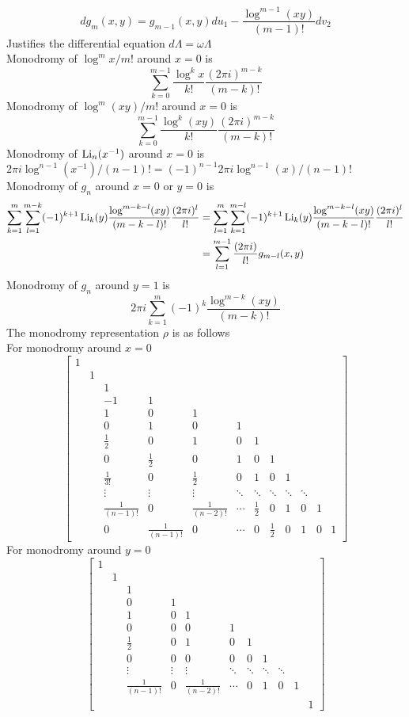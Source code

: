 \documentclass[main]{subfiles}
\begin{document}
\[dg_m(x,y)=g_{m-1}(x,y)du_1-\frac{\log^{m-1}(xy)}{(m-1)!}dv_2\]
Justifies the differential equation $d\Lambda=\omega\Lambda$ \\
Monodromy of $\log^mx/m!$ around $x=0$ is
\[\sum_{k=0}^{m-1}\frac{\log^kx}{k!}\frac{(2\pi i)^{m-k}}{(m-k)!}\]
Monodromy of $\log^m(xy)/m!$ around $x=0$ is
\[\sum_{k=0}^{m-1}\frac{\log^k(xy)}{k!}\frac{(2\pi i)^{m-k}}{(m-k)!}\]
Monodromy of $\operatorname{Li}_n(x^{-1})$ around $x=0$ is $2\pi i\log^{n-1}(x^{-1})/(n-1)!=(-1)^{n-1}2\pi i\log^{n-1}(x)/(n-1)!$ \\
Monodromy of $g_n$ around $x=0$ or $y=0$ is
\begin{align*}
\sum_{k=1}^{m}\sum_{l=1}^{m-k}(-1)^{k+1}\operatorname{Li}_k(y)\frac{\log^{m-k-l}(xy)}{(m-k-l)!}\frac{(2\pi i)^{l}}{l!}&=\sum_{l=1}^{m}\sum_{k=1}^{m-l}(-1)^{k+1}\operatorname{Li}_k(y)\frac{\log^{m-k-l}(xy)}{(m-k-l)!}\frac{(2\pi i)^{l}}{l!} \\
&=\sum_{l=1}^{m-1}\frac{(2\pi i)}{l!}g_{m-l}(x,y)
\end{align*}
Monodromy of $g_n$ around $y=1$ is
\[2\pi i\sum_{k=1}^{m}(-1)^k\frac{\log^{m-k}(xy)}{(m-k)!}\]
The monodromy representation $\rho$ is as follows \\
For monodromy around $x=0$
\[\begin{bmatrix}
1\\
&1\\
&&1\\
&&-1&1\\
&&1&0&1\\
&&0&1&0&1\\
&&\frac{1}{2}&0&1&0&1\\
&&0&\frac{1}{2}&0&1&0&1\\
&&\frac{1}{3!}&0&\frac{1}{2}&0&1&0&1\\
&&\vdots&\vdots&\vdots&\ddots&\ddots&\ddots&\ddots&\ddots\\
&&\frac{1}{(n-1)!}&0&\frac{1}{(n-2)!}&\cdots&\frac{1}{2}&0&1&0&1 \\
&&0&\frac{1}{(n-1)!}&0&\cdots&0&\frac{1}{2}&0&1&0&1
\end{bmatrix}\]
For monodromy around $y=0$
\[\begin{bmatrix}
1\\
&1\\
&&1\\
&&0&1\\
&&1&0&1\\
&&0&0&0&1\\
&&\frac{1}{2}&0&1&0&1\\
&&0&0&0&0&0&1\\
&&\vdots&\vdots&\vdots&\ddots&\ddots&\ddots&\ddots\\
&&\frac{1}{(n-1)!}&0&\frac{1}{(n-2)!}&\cdots&0&1&0&1\\
&&&&&&&&&&1
\end{bmatrix}\]
\end{document}

